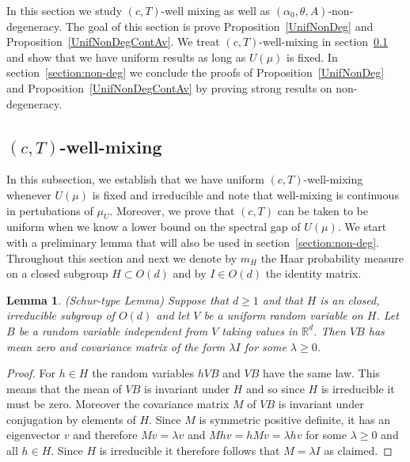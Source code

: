 \documentclass[10pt, english,oneside,reqno]{amsart}
\theoremstyle{plain}
\newtheorem{lemma}[theorem]{Lemma}
\theoremstyle{remark}
\numberwithin{equation}{section}
\numberwithin{figure}{section}
\newcommand{\R}{\mathbb{R}}
\newcommand{\Haarof}[1]{m_{#1}}
\begin{document}
    \label{section:mixnondeg}
    

In this section we study $(c,T)$-well mixing as well as $(\alpha_0, \theta, A)$-non-degeneracy. The goal of this section is prove Proposition~\ref{UnifNonDeg} and Proposition~\ref{UnifNonDegContAv}. We treat $(c,T)$-well-mixing in section~\ref{MixingSection} and show that we have uniform results as long as $U(\mu)$ is fixed. In section~\ref{section:non-deg} we conclude the proofs of Proposition~\ref{UnifNonDeg} and Proposition~\ref{UnifNonDegContAv} by proving strong results on non-degeneracy. 

\subsection{$(c, T)$-well-mixing}\label{MixingSection}

In this subsection, we establish that we have uniform $(c,T)$-well-mixing whenever $U(\mu)$ is fixed and irreducible and note that well-mixing is continuous in pertubations of $\mu_U$. Moreover, we prove that $(c,T)$ can be taken to be uniform when we know a lower bound on the spectral gap of $U(\mu)$. We start with a preliminary lemma that will also be used in section~\ref{section:non-deg}. Throughout this section and next we denote by $\Haarof{H}$ the Haar probability measure on a closed subgroup $H\subset O(d)$ and by $I \in O(d)$ the identity matrix. 

\begin{lemma}\label{IrreducibleTrick}(Schur-type Lemma)
    Suppose that $d\geq 1$ and that $H$ is an closed, irreducible subgroup of $O(d)$ and let $V$ be a uniform random variable on $H$. Let $B$ be a random variable independent from $V$ taking values in $\R^d$. Then $VB$ has mean zero and covariance matrix of the form $\lambda I$ for some $\lambda \geq 0$.
\end{lemma}

\begin{proof}
    For $h \in H$ the random variables $h VB$ and $VB$ have the same law. This means that the mean of $VB$ is invariant under $H$ and so since $H$ is irreducible it must be zero. Moreover the covariance matrix $M$ of $VB$ is invariant under conjugation by elements of $H$. Since $M$ is symmetric positive definite, it has an eigenvector $v$ and therefore $Mv = \lambda v$ and $Mhv = hMv = \lambda h v$ for some $\lambda \geq 0$ and all $h\in H$. Since $H$ is irreducible it therefore follows that $M  = \lambda I$ as claimed. 
\end{proof}
\end{document}

